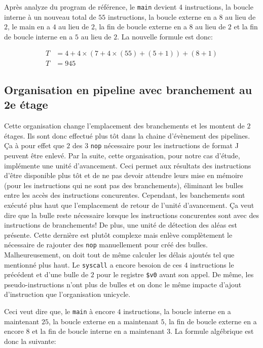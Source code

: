 \documentclass[a11paper]{article}
\begin{document}
Après analyze du program de référence, le \verb|main| devient 4 instructions,
la boucle interne à un nouveau total de $55$ instructions, la boucle externe
en a $8$ au lieu de $2$, le main en a $4$ au lieu de $2$, la fin de boucle
externe en a $8$ au lieu de $2$ et la fin de boucle interne en a $5$ au lieu
de $2$. La nouvelle formule est donc:

\begin{align}
  T &= 4+ 4\times(7+4\times(55)+(5+1)) + (8+1) \\
  T &= 945
\end{align}

\subsection{Organisation en pipeline avec branchement au 2e étage}

Cette organisation change l'emplacement des branchements et les montent de
$2$ étages. Ils sont donc effectué plus tôt dans la chaine d'évènement des
pipelines. Ça à pour effet que $2$ des $3$ \verb|nop| nécessaire pour les
instructions de format J peuvent être enlevé. Par la suite, cette
organisation, pour notre cas d'étude, implémente une unité d'avancement. Ceci
permet aux résultats des instructions d'être disponible plus tôt et de ne pas
devoir attendre leurs mise en mémoire (pour les instructions qui ne sont pas
des branchements), éliminant les bulles entre les accès des instructions
concurentes. Cependant, les banchements sont exécuté plus haut que
l'emplacement de retour de l'unité d'avancement. Ça veut dire que la bulle
reste nécessaire lorsque les instructions concurentes sont avec des
instructions de branchements! De plus, une unité de détection des aléas est
présente. Cette dernière est plutôt complexe mais enlève complètement le
nécessaire de rajouter des \verb|nop| manuellement pour créé des bulles.
Malheureusement, on doit tout de même calculer les délais ajoutés tel que
mentionné plus haut. Le \verb|syscall| a encore besoion de ces $4$
instructions le précédent et d'une bulle de $2$ pour le registre \verb|$v0|
avant son appel. De même, les pseudo-instructions n'ont plus de bulles et on
donc le même impacte d'ajout d'instruction que l'organisation unicycle.

Ceci veut dire que, le \verb|main| à encore $4$ instructions, la boucle
interne en a maintenant $25$, la boucle externe en a maintenant $5$, la fin
de boucle externe en a encore $8$ et la fin de boucle interne en a maintenant
$3$. La formule algébrique est donc la suivante:
\end{document}
